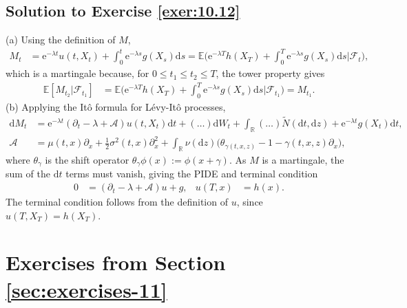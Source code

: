 \documentclass[12pt]{book}
\let\varphi\phi
\numberwithin{equation}{chapter}
\theoremstyle{plain}
\numberwithin{theorem}{section}
\theoremstyle{definition}
\numberwithin{exercise}{chapter}
\newcommand{\<}{\langle}
\renewcommand{\>}{\rangle}
\renewcommand{\(}{\left(}
\renewcommand{\)}{\right)}
\renewcommand{\[}{\left[}
\renewcommand{\]}{\right]}
\newcommand\Eb{\mathds{E}}
\newcommand\Rb{\mathds{R}}
\newcommand\Ac{\mathscr{A}}
\newcommand\Fc{\mathscr{F}}
\newcommand\sig{\sigma}
\newcommand\gam{\gamma}
\newcommand\lam{\lambda}
\newcommand\Nt{\widetilde{N}}
\renewcommand\d{\partial}
\newcommand\dd{\mathrm{d}}
\newcommand\ee{\mathrm{e}}
\begin{document}
\subsection*{Solution to Exercise \ref{exer:10.12}}
(a) Using the definition of $M$,
\begin{align}
M_t
	&=	\ee^{- \lam t} u(t,X_t) + \int_0^t \ee^{- \lam s} g(X_s) \dd s
	=		\Eb \Big( \ee^{- \lam T} h(X_T) + \int_0^T \ee^{- \lam s} g(X_s) \dd s \Big| \Fc_t \Big) ,
\end{align}
which is a martingale because, for $0 \leq t_1 \leq t_2 \leq T$, the tower property gives
\begin{align}
\Eb[ M_{t_2} | \Fc_{t_1} ]
	&=	\Eb \Big( \ee^{- \lam T} h(X_T) + \int_0^T \ee^{- \lam s} g(X_s) \dd s \Big| \Fc_{t_1} \Big)
	=		M_{t_1} .
\end{align}
(b) Applying the It\^o formula for L\'evy-It\^o processes,
\begin{align}
\dd M_t
	&=	\ee^{- \lam t} ( \d_t - \lam + \Ac) u(t,X_t) \dd t + ( \ldots ) \dd W_t + \int_\Rb ( \ldots ) \Nt(\dd t, \dd z)  + \ee^{- \lam t} g(X_t) \dd t , \\
\Ac
	&=	\mu(t,x) \d_x + \tfrac{1}{2} \sig^2(t,x) \d_x^2 + \int_\Rb \nu(\dd z) \Big( \theta_{\gam(t,x,z)} - 1 - \gam(t,x,z) \d_x \Big) ,
\end{align}
where $\theta_\gam$ is the shift operator $\theta_\gam \varphi(x) := \varphi(x + \gam)$.  As $M$ is a martingale, the sum of the $\dd t$ terms must vanish, giving the PIDE and terminal condition
\begin{align}
0
	&=	( \d_t - \lam + \Ac) u + g , &
u(T,x) 
	&=	h(x) .
\end{align}
The terminal condition follows from the definition of $u$, since $u(T,X_T) = h(X_T)$.


\section{Exercises from Section \ref{sec:exercises-11}}
\end{document}
